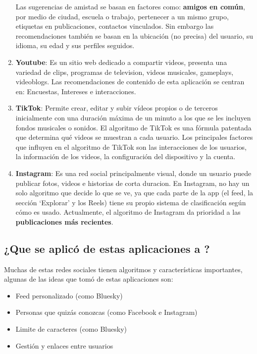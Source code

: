\begin{enumerate}
    Las sugerencias de amistad se basan en factores como: \textbf{amigos en común}, por medio de ciudad, escuela o trabajo, pertenecer a un mismo grupo, etiquetas en publicaciones, contactos vinculados. Sin embargo las recomendaciones también se basan en la ubicación (no precisa) del usuario, su idioma, su edad y sus perfiles seguidos.

    \item \textbf{Youtube}: Es un sitio web dedicado a compartir videos, presenta una variedad de clips, programas de television, videos musicales, gameplays, videoblogs. Las recomendaciones de contenido de esta aplicación se centran en: Encuestas, Intereses e interacciones.

    \item \textbf{TikTok}: Permite crear, editar y subir vídeos propios o de terceros inicialmente con una duración máxima de un minuto a los que se les incluyen fondos musicales o sonidos.
    El algoritmo de TikTok es una fórmula patentada que determina qué videos se muestran a cada usuario. Los principales factores que influyen en el algoritmo de TikTok son las interacciones de los usuarios, la información de los videos, la configuración del dispositivo y la cuenta.
    \item \textbf{Instagram}: Es una red social principalmente visual, donde un usuario puede publicar fotos, videos e historias de corta duracion. En Instagram, no hay un solo algoritmo que decide lo que se ve, ya que cada parte de la app (el feed, la sección `Explorar' y los Reels) tiene su propio sistema de clasificación según cómo es usado. Actualmente, el algoritmo de Instagram da prioridad a las \textbf{publicaciones más recientes}.
\end{enumerate}

\subsection*{¿Que se aplicó de estas aplicaciones a \loopweb?}
Muchas de estas redes sociales tienen algoritmos y características importantes, algunas de las ideas que tomó \loopweb de estas aplicaciones son:
\begin{itemize}
    \item Feed personalizado (como Bluesky)
    \item Personas que quizás conozcas (como Facebook e Instagram)
    \item Limite de caracteres (como Bluesky)
    \item Gestión y enlaces entre usuarios
\end{itemize}